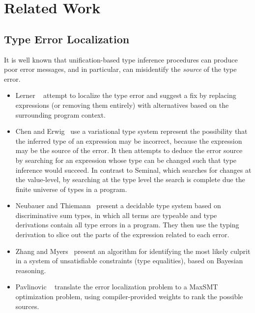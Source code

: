 \section{Related Work}
\label{sec:related-work}

\subsection{Type Error Localization}
\label{sec:type-error-local}
It is well known that unification-based type inference procedures can
produce poor error messages, and in particular, can misidentify the
\emph{source} of the type error.
%


\begin{itemize}
\item Lerner \etal~\cite{lerner_searching_2007} attempt to localize the
  type error and suggest a fix by replacing expressions (or removing
  them entirely) with alternatives based on the surrounding program
  context.
\item Chen and Erwig~\cite{chen_counter-factual_2014} use a variational
  type system represent the possibility that the inferred type of an
  expression may be incorrect, because the expression may be the source
  of the error. It then attempts to deduce the error source by searching
  for an expression whose type can be changed such that type inference
  would succeed. In contrast to Seminal, which searches for changes at
  the value-level, by searching at the type level the search is complete
  due the finite universe of types in a program.
\item Neubauer and Thiemann~\cite{neubauer_discriminative_2003} present
  a decidable type system based on discriminative sum types, in which
  all terms are typeable and type derivations contain all type errors in
  a program. They then use the typing derivation to slice out the parts
  of the expression related to each error.
\item Zhang and Myers~\cite{zhang_toward_2014} present an algorithm for
  identifying the most likely culprit in a system of unsatisfiable
  constraints (\eg type equalities), based on Bayesian reasoning.
\item Pavlinovic \etal~\cite{pavlinovic_finding_2014} translate the
  error localization problem to a MaxSMT optimization problem, using
  compiler-provided weights to rank the possible sources.
\end{itemize}

